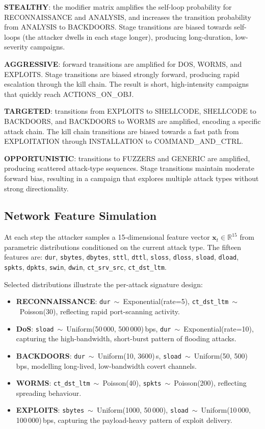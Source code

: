 \textbf{STEALTHY}: the modifier matrix amplifies the self-loop probability
for RECONNAISSANCE and ANALYSIS, and increases the transition probability
from ANALYSIS to BACKDOORS.
Stage transitions are biased towards self-loops (the attacker dwells in each
stage longer), producing long-duration, low-severity campaigns.

\textbf{AGGRESSIVE}: forward transitions are amplified for DOS, WORMS, and
EXPLOITS.
Stage transitions are biased strongly forward, producing rapid escalation
through the kill chain.
The result is short, high-intensity campaigns that quickly reach ACTIONS\_ON\_OBJ.

\textbf{TARGETED}: transitions from EXPLOITS to SHELLCODE, SHELLCODE to
BACKDOORS, and BACKDOORS to WORMS are amplified, encoding a specific attack
chain.
The kill chain transitions are biased towards a fast path from EXPLOITATION
through INSTALLATION to COMMAND\_AND\_CTRL.

\textbf{OPPORTUNISTIC}: transitions to FUZZERS and GENERIC are amplified,
producing scattered attack-type sequences.
Stage transitions maintain moderate forward bias, resulting in a campaign that
explores multiple attack types without strong directionality.

\subsection{Network Feature Simulation}
\label{sec:features}

At each step the attacker samples a 15-dimensional feature vector
$\mathbf{x}_t \in \mathbb{R}^{15}$ from parametric distributions conditioned
on the current attack type.
The fifteen features are:
\texttt{dur}, \texttt{sbytes}, \texttt{dbytes}, \texttt{sttl},
\texttt{dttl}, \texttt{sloss}, \texttt{dloss}, \texttt{sload},
\texttt{dload}, \texttt{spkts}, \texttt{dpkts}, \texttt{swin},
\texttt{dwin}, \texttt{ct\_srv\_src}, \texttt{ct\_dst\_ltm}.

Selected distributions illustrate the per-attack signature design:

\begin{itemize}
  \item \textbf{RECONNAISSANCE}: \texttt{dur}~$\sim$~Exponential(rate=5),
        \texttt{ct\_dst\_ltm}~$\sim$~Poisson(30), reflecting rapid
        port-scanning activity.
  \item \textbf{DoS}: \texttt{sload}~$\sim$~Uniform(50\,000, 500\,000)\,bps,
        \texttt{dur}~$\sim$~Exponential(rate=10), capturing the high-bandwidth,
        short-burst pattern of flooding attacks.
  \item \textbf{BACKDOORS}: \texttt{dur}~$\sim$~Uniform(10, 3600)\,s,
        \texttt{sload}~$\sim$~Uniform(50, 500)\,bps, modelling long-lived,
        low-bandwidth covert channels.
  \item \textbf{WORMS}: \texttt{ct\_dst\_ltm}~$\sim$~Poisson(40),
        \texttt{spkts}~$\sim$~Poisson(200), reflecting spreading behaviour.
  \item \textbf{EXPLOITS}: \texttt{sbytes}~$\sim$~Uniform(1000, 50\,000),
        \texttt{sload}~$\sim$~Uniform(10\,000, 100\,000)\,bps, capturing
        the payload-heavy pattern of exploit delivery.
\end{itemize}

